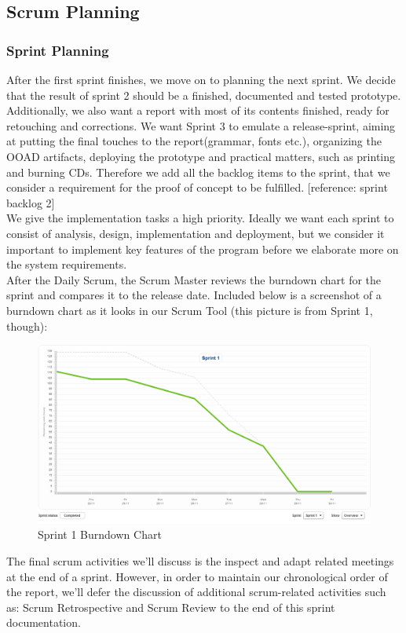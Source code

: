 \subsection{Scrum Planning}
\subsubsection{Sprint Planning}
After the first sprint finishes, we move on to planning the next sprint. We decide that the result of sprint 2 should be a finished, documented and tested prototype. Additionally, we also want a report with most of its contents finished, ready for retouching and corrections. We want Sprint 3 to emulate a release-sprint, aiming at putting the final touches to the report(grammar, fonts etc.), organizing the OOAD artifacts, deploying the prototype and practical matters, such as printing and burning CDs. Therefore we add all the backlog items to the sprint, that we consider a requirement for the proof of concept to be fulfilled. [reference: sprint backlog 2]\\
We give the implementation tasks a high priority. Ideally we want each sprint to consist of analysis, design, implementation and deployment, but we consider it important to implement key features of the program before we elaborate more on the system requirements.\\

After the Daily Scrum, the Scrum Master reviews the burndown chart for the sprint and compares it to the release date. Included below is a screenshot of a burndown chart as it looks in our Scrum Tool (this picture is from Sprint 1, though):\\
\begin{figure}[H]
  \includegraphics[width=\textwidth,natwidth=1253,natheight=673]{illustrations/burndown.png}
  \caption{Sprint 1 Burndown Chart}
  \label{sprint1burnchart}
\end{figure}
The final scrum activities we’ll discuss is the inspect and adapt related meetings at the end of a sprint. However, in order to maintain our chronological order of the report, we’ll defer the discussion of additional scrum-related activities such as: Scrum Retrospective and Scrum Review to the end of this sprint documentation.\\
\newpage